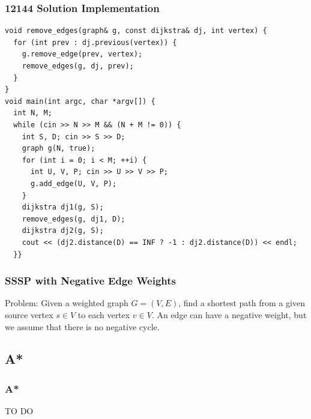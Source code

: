 \documentclass{beamer}
\begin{document}
\begin{frame}[containsverbatim]
\frametitle{12144 Solution Implementation}
\scriptsize
\begin{lstlisting}
void remove_edges(graph& g, const dijkstra& dj, int vertex) {
  for (int prev : dj.previous(vertex)) {
    g.remove_edge(prev, vertex);
    remove_edges(g, dj, prev);
  }
}
void main(int argc, char *argv[]) {
  int N, M;
  while (cin >> N >> M && (N + M != 0)) {
    int S, D; cin >> S >> D;
    graph g(N, true);
    for (int i = 0; i < M; ++i) {
      int U, V, P; cin >> U >> V >> P;
      g.add_edge(U, V, P);
    }
    dijkstra dj1(g, S);
    remove_edges(g, dj1, D);
    dijkstra dj2(g, S);
    cout << (dj2.distance(D) == INF ? -1 : dj2.distance(D)) << endl;
  }}
\end{lstlisting}

\end{frame}

\fi

\begin{frame}%
\frametitle{SSSP with Negative Edge Weights}

\begin{mdframed}[style=exampledefault]
Problem: Given a weighted graph $G = (V, E)$, find a shortest path from a given source vertex $s \in V$ to each vertex
$v \in V$. An edge can have a negative weight, but we assume that there is no negative cycle.
\end{mdframed}


\end{frame}



\subsection{A*}

\begin{frame}%
\frametitle{A*}

TO DO

\end{frame}
\end{document}
